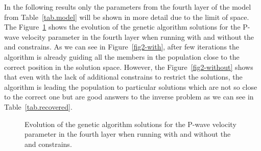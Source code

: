 \documentclass{vie16}
\begin{document}
In the following results only the parameters from the fourth layer of the 
model from Table~\ref{tab.model} will be shown in more detail due to the 
limit of space. The Figure~\ref{fig2} shows the evolution of the genetic 
algorithm solutions for the P-wave velocity parameter in the fourth layer 
when running with and without the \cite{Gardner1974} and 
\cite{Castagna1985} constrains. As we can see in Figure~\ref{fig2-with}, 
after few iterations the algorithm is already guiding all the members in the 
population close to the correct position in the solution space.
However, the Figure~\ref{fig2-without} shows that even with the lack of 
additional constrains to restrict the solutions, the algorithm is leading the 
population to particular solutions which are not so close to the correct one 
but are good answers to the inverse problem as we can see in 
Table~\ref{tab.recovered}.

\begin{figure}[H]
\subfigtopskip-5pt
\caption{Evolution of the genetic algorithm solutions for the P-wave 
velocity parameter in the fourth layer when running with  
and without  the \cite{Gardner1974} and 
\cite{Castagna1985} constrains.
}
\label{fig2}
\end{figure}
\end{document}
